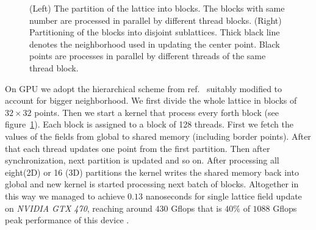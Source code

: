 \documentclass[a4paper]{llncs}
\begin{document}
\begin{figure}
\begin{center}
\end{center}
\caption{\label{fig:nn} (Left) The partition of the lattice into
  blocks. The blocks with same number are processed in parallel by
  different thread blocks.  (Right) Partitioning of the blocks into
  disjoint sublattices.  Thick black line denotes the neighborhood  used in updating the center point. Black points are processes in parallel by
  different threads of the same thread block.}
\end{figure}


On GPU we adopt the hierarchical scheme from ref.~\cite{weigel}
suitably modified to account for bigger neighborhood.  We first divide
the whole lattice in blocks of $32\times 32$ points. Then we start a
kernel that process every forth block (see figure~\ref{fig:nn}).  Each
block is assigned to a block of 128 threads. First we fetch the values of the fields from global to shared memory (including border points).  
After that each thread updates
one point from the first partition. Then after synchronization, next
partition is updated and so on. After processing all eight(2D) or 16
(3D) partitions the kernel writes the shared memory back into global
and new kernel is started processing next batch of blocks. 
Altogether in this
way we managed to achieve $0.13$ nanoseconds for single lattice field
update on \emph{NVIDIA GTX 470}, reaching around $430$ Gflops that is
$40\%$ of $1088$ Gflops peak performance of this device .
\end{document}
